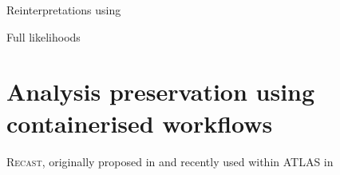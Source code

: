 Reinterpretations using 

Full likelihoods~\cite{ATL-PHYS-PUB-2019-029}


\section{Analysis preservation using containerised workflows}\label{sec:recast_implementation}




\textsc{Recast}, originally proposed in \cite{RECAST_cranmer} and recently used within ATLAS in \eg {}\cite{ATL-PHYS-PUB-2019-032}